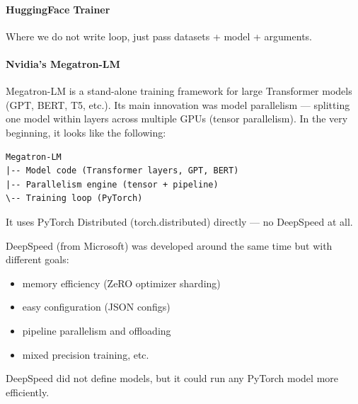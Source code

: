 \documentclass[11pt]{article}  %
\begin{document}
\paragraph{HuggingFace Trainer}
Where we do not write loop, just pass datasets + model + arguments.


\paragraph{Nvidia's Megatron-LM}
Megatron-LM is a stand-alone training framework for large Transformer models (GPT, BERT, T5, etc.).
Its main innovation was model parallelism — splitting one model within layers across multiple GPUs (tensor parallelism).
In the very beginning, it looks like the following:

\begin{verbatim}
Megatron-LM
|-- Model code (Transformer layers, GPT, BERT)
|-- Parallelism engine (tensor + pipeline)
\-- Training loop (PyTorch)
\end{verbatim}
It uses PyTorch Distributed (torch.distributed) directly — no DeepSpeed at all.

DeepSpeed (from Microsoft) was developed around the same time but with different goals:
\begin{itemize}
  \item memory efficiency (ZeRO optimizer sharding)
  \item easy configuration (JSON configs)
  \item pipeline parallelism and offloading
  \item mixed precision training, etc.
\end{itemize}
DeepSpeed did not define models, but it could run any PyTorch model more efficiently.
\end{document}
